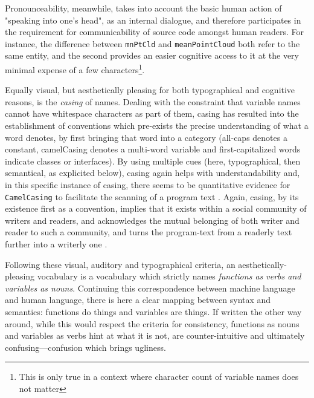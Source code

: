 Pronounceability, meanwhile, takes into account the basic human action of "speaking into one's head", as an internal dialogue, and therefore participates in the requirement for communicability of source code amongst human readers. For instance, the difference between \lstinline{mnPtCld} and \lstinline{meanPointCloud} both refer to the same entity, and the second provides an easier cognitive access to it at the very minimal expense of a few characters\footnote{This is only true in a context where character count of variable names does not matter}.

Equally visual, but aesthetically pleasing for both typographical and cognitive reasons, is the \emph{casing} of names. Dealing with the constraint that variable names cannot have whitespace characters as part of them, casing has resulted into the establishment of conventions which pre-exists the precise understanding of what a word denotes, by first bringing that word into a category (all-caps denotes a constant, camelCasing denotes a multi-word variable and first-capitalized words indicate classes or interfaces). By using multiple cues (here, typographical, then semantical, as explicited below), casing again helps with understandability and, in this specific instance of casing, there seems to be quantitative evidence for \lstinline{CamelCasing} to facilitate the scanning of a program text \citep{binkley_camelcase_2009}. Again, casing, by its existence first as a convention, implies that it exists within a social community of writers and readers, and acknowledges the mutual belonging of both writer and reader to such a community, and turns the program-text from a readerly text further into a writerly one \citep{barthes_bruissement_1984}.

Following these visual, auditory and typographical criteria, an aesthetically-pleasing vocabulary is a vocabulary which strictly names \emph{functions as verbs and variables as nouns}. Continuing this correspondence between machine language and human language, there is here a clear mapping between syntax and semantics: functions do things and variables are things. If written the other way around, while this would respect the criteria for consistency, functions as nouns and variables as verbs hint at what it is not, are counter-intuitive and ultimately confusing—confusion which brings ugliness.

